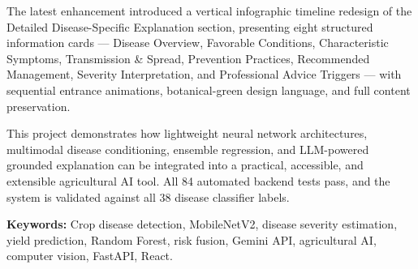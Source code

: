 \par
The latest enhancement introduced a vertical infographic timeline redesign of the Detailed Disease-Specific Explanation section, presenting eight structured information cards --- Disease Overview, Favorable Conditions, Characteristic Symptoms, Transmission \& Spread, Prevention Practices, Recommended Management, Severity Interpretation, and Professional Advice Triggers --- with sequential entrance animations, botanical-green design language, and full content preservation.

\par
This project demonstrates how lightweight neural network architectures, multimodal disease conditioning, ensemble regression, and LLM-powered grounded explanation can be integrated into a practical, accessible, and extensible agricultural AI tool. All 84 automated backend tests pass, and the system is validated against all 38 disease classifier labels.

\vspace{10pt}
\noindent\textbf{Keywords:} Crop disease detection, MobileNetV2, disease severity estimation, yield prediction, Random Forest, risk fusion, Gemini API, agricultural AI, computer vision, FastAPI, React.

